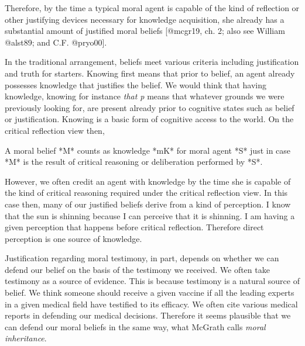 \documentclass[12pt]{book}
\theoremstyle{definition}
\theoremstyle{remark}
\newcommand{\NormalTok}[1]{#1}
\newenvironment{Shaded}{}{}
\newenvironment{Highlighting}{}{}
\begin{document}
\begin{Shaded}
\begin{Highlighting}[]

\NormalTok{Therefore, by the time a typical moral agent is capable of the kind of reflection or other justifying devices necessary for knowledge acquisition, she already has a substantial amount of justified moral beliefs [@mcgr19, ch. 2; also see William @alst89; and C.F. @pryo00].}
\end{Highlighting}
\end{Shaded}

In the traditional arrangement, beliefs meet various criteria including justification and truth for starters. Knowing first means that prior to belief, an agent already possesses knowledge that justifies the belief. We would think that having knowledge, knowing for instance \emph{that p} means that whatever grounds we were previously looking for, are present already prior to cognitive states such as belief or justification. Knowing is a basic form of cognitive access to the world. On the critical reflection view then,

\begin{Shaded}
\begin{Highlighting}[]

\NormalTok{A moral belief *M* counts as knowledge *mK* for moral agent *S* just in case *M* is the result of critical reasoning or deliberation performed by *S*.}
\end{Highlighting}
\end{Shaded}

However, we often credit an agent with knowledge by the time she is capable of the kind of critical reasoning required under the critical reflection view. In this case then, many of our justified beliefs derive from a kind of perception. I know that the sun is shinning because I can perceive that it is shinning. I am having a given perception that happens before critical reflection. Therefore direct perception is one source of knowledge.

Justification regarding moral testimony, in part, depends on whether we can defend our belief on the basis of the testimony we received. We often take testimony as a source of evidence. This is because testimony is a natural source of belief. We think someone should receive a given vaccine if all the leading experts in a given medical field have testified to its efficacy. We often cite various medical reports in defending our medical decisions. Therefore it seems plausible that we can defend our moral beliefs in the same way, what McGrath calls \emph{moral inheritance}.
\end{document}
